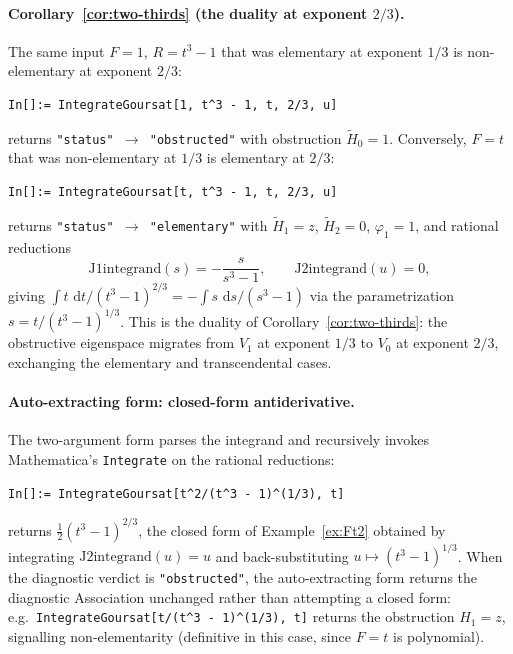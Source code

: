 \documentclass[11pt,a4paper]{article}
\theoremstyle{plain}
\theoremstyle{definition}
\theoremstyle{remark}
\renewcommand{\d}{\,\mathrm{d}}
\begin{document}
\paragraph{Corollary~\ref{cor:two-thirds} (the duality at exponent $2/3$).} The same input $F=1$, $R=t^3-1$ that was elementary at exponent $1/3$ is non-elementary at exponent $2/3$:
\begin{lstlisting}[basicstyle=\footnotesize\ttfamily,frame=none]
In[]:= IntegrateGoursat[1, t^3 - 1, t, 2/3, u]
\end{lstlisting}
returns \texttt{"status"\,$\to$\,"obstructed"} with obstruction $\widetilde H_0 = 1$. Conversely, $F=t$ that was non-elementary at $1/3$ is elementary at $2/3$:
\begin{lstlisting}[basicstyle=\footnotesize\ttfamily,frame=none]
In[]:= IntegrateGoursat[t, t^3 - 1, t, 2/3, u]
\end{lstlisting}
returns \texttt{"status"\,$\to$\,"elementary"} with $\widetilde H_1 = z$, $\widetilde H_2 = 0$, $\varphi_1 = 1$, and rational reductions
\[
  \text{J1integrand}(s) = -\frac{s}{s^3-1},\qquad \text{J2integrand}(u) = 0,
\]
giving $\int t\,\d t/(t^3-1)^{2/3} = -\int s\,\d s/(s^3-1)$ via the parametrization $s = t/(t^3-1)^{1/3}$. This is the duality of Corollary~\ref{cor:two-thirds}: the obstructive eigenspace migrates from $V_1$ at exponent $1/3$ to $V_0$ at exponent $2/3$, exchanging the elementary and transcendental cases.

\medskip
\noindent
\paragraph{Auto-extracting form: closed-form antiderivative.} The two-argument form parses the integrand and recursively invokes Mathematica's \texttt{Integrate} on the rational reductions:
\begin{lstlisting}[basicstyle=\footnotesize\ttfamily,frame=none]
In[]:= IntegrateGoursat[t^2/(t^3 - 1)^(1/3), t]
\end{lstlisting}
returns $\tfrac{1}{2}(t^3-1)^{2/3}$, the closed form of Example~\ref{ex:Ft2} obtained by integrating $\text{J2integrand}(u) = u$ and back-substituting $u\mapsto (t^3-1)^{1/3}$. When the diagnostic verdict is \texttt{"obstructed"}, the auto-extracting form returns the diagnostic Association unchanged rather than attempting a closed form: e.g.\ \texttt{IntegrateGoursat[t/(t\textasciicircum 3 - 1)\textasciicircum(1/3), t]} returns the obstruction $H_1 = z$, signalling non-elementarity (definitive in this case, since $F=t$ is polynomial).
\end{document}
